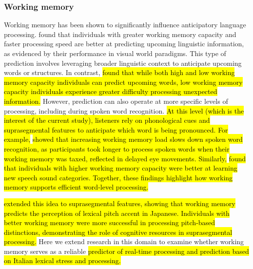 \subsubsection{Working memory}
Working memory has been shown to significantly influence anticipatory language processing. \cite{Huettig2016} found that individuals with greater working memory capacity and faster processing speed are better at predicting upcoming linguistic information, as evidenced by their performance in visual world paradigms. This type of prediction involves leveraging broader linguistic context to anticipate upcoming words or structures. In contrast, \cite{otten2009}\hl{ found that while both high and low working memory capacity individuals can predict upcoming words, low working memory capacity individuals experience greater difficulty processing unexpected information.} However, prediction can also operate at more specific levels of processing, including during spoken word recognition. \hl{At this level (which is the interest of the current study), listeners rely on phonological cues and suprasegmental features to anticipate which word is being pronounced. For example,} \cite{hadar_2016} \hl{showed that increasing working memory load slows down spoken word recognition, as participants took longer to process spoken words when their working memory was taxed, reflected in delayed eye movements. Similarly,} \cite{mchaney_et_al_2021_workingmemory} \hl{found that individuals with higher working memory capacity were better at learning new speech sound categories. Together, these findings highlight how working memory supports efficient word-level processing.}

\cite{goss_2014} \hl{extended this idea to suprasegmental features, showing that working memory predicts the perception of lexical pitch accent in Japanese. Individuals with better working memory were more successful in processing pitch-based distinctions, demonstrating the role of cognitive resources in suprasegmental processing.} Here we extend research in this domain to examine whether working memory serves as a reliable \hl{predictor of real-time processing and prediction based on Italian lexical stress and processing.}


